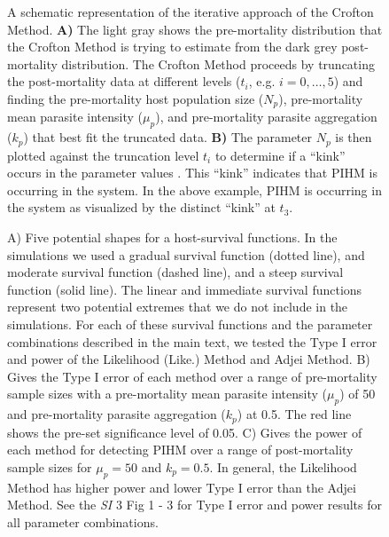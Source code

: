 \documentclass[12pt, a4paper]{article}
\begin{document}
\begin{figure}

    \captionsetup{justification=raggedright, singlelinecheck=false}

    \caption{A schematic representation of the iterative approach of the Crofton Method. \textbf{A)} The light gray shows the pre-mortality distribution that the Crofton Method is trying to estimate from the dark grey post-mortality distribution.  The Crofton Method proceeds by truncating the post-mortality data at different levels ($t_i$, e.g. $i= 0, \dots, 5$) and finding the pre-mortality host population size ($N_p$), pre-mortality mean parasite intensity ($\mu_p$), and pre-mortality parasite aggregation ($k_p$) that best fit the truncated data. \textbf{B)} The parameter $N_p$ is then plotted against the truncation level $t_i$ to determine if a ``kink'' occurs in the parameter values  \citep{Lester1984}. This ``kink'' indicates that PIHM is occurring in the system. In the above example, PIHM is occurring in the system as visualized by the distinct ``kink'' at $t_3$.}
    \label{fig:crofton}

\end{figure}

\begin{figure}

    \captionsetup{justification=raggedright, singlelinecheck=false}


    \caption{A) Five potential shapes for a host-survival functions. In the simulations we used a gradual survival function (dotted line), and moderate survival function (dashed line), and a steep survival function (solid line). The linear and immediate survival functions represent two potential extremes that we do not include in the simulations. For each of these survival functions and the parameter combinations described in the main text, we tested the Type I error and power of the Likelihood (Like.) Method and Adjei Method. B) Gives the Type I error of each method over a range of pre-mortality sample sizes with a pre-mortality mean parasite intensity ($\mu_p$) of 50 and pre-mortality parasite aggregation ($k_p$) at 0.5. The red line shows the pre-set significance level of 0.05. C) Gives the power of each method for detecting PIHM over a range of post-mortality sample sizes for $\mu_p = 50$ and $k_p = 0.5$.  In general, the Likelihood Method has higher power and lower Type I error than the Adjei Method.  See the \emph{SI} 3 Fig 1 - 3 for Type I error and power results for all parameter combinations.}

\label{fig:question1}

\end{figure}
\end{document}
